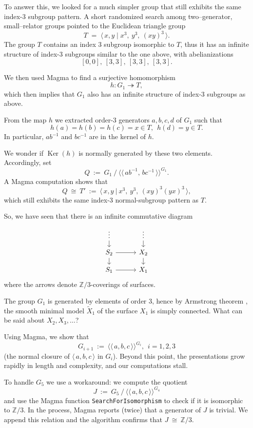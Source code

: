 \documentclass[10pt,a4paper]{article}
\DeclareMathOperator{\Ker}{Ker}
\newcommand{\ZZ}{\mathbb{Z}}
\begin{document}
To answer this, we looked for a much simpler group that still exhibits the
same index-\(3\) subgroup pattern. A short randomized search among
two–generator, small–relator groups pointed to the Euclidean triangle group
\[
T \;=\; \langle\, x,y \mid x^{3},\ y^{3},\ (xy)^{3}\,\rangle .
\]
The group $T$ contains an index $3$ subgroup isomorphic to $T$, thus it
has an infinite structure of index-3 subgroups similar to the one above,
with abelianizations
$$[0,0],\ [3,3],\ [3,3],\ [3,3].$$

We then used Magma to find a surjective homomorphism $$h:G_1\twoheadrightarrow T,$$
which then implies that $G_1$ also has an infinite structure of index-3 subgroups as above.

From the map $h$ we extracted order-3 generators $a,b,c,d$ of $G_1$ such that
$$h(a)=h(b)=h(c)=x \in T,\ \ h(d)=y\in T.$$
In particular, $ab^{-1}$ and $bc^{-1}$ are in the kernel of $h.$

We wonder if $\Ker(h)$ is normally generated by these two elements.
Accordingly, set
$$Q\ :=\ G_1\ \big/\ \big\langle\!\big\langle\, ab^{-1},\,bc^{-1}\,\big\rangle\!\big\rangle^{G_1}.$$
A Magma computation shows that
$$Q\ \cong\ T'\ :=\ \big\langle\, x,y\ \big|\ x^{3},\ y^{3},\ (xy)^{3}(yx)^{3}\,\big\rangle,$$
which still exhibits the same index-3 normal-subgroup pattern as $T$.

So, we have seen that there is an infinite commutative diagram
\[
\begin{tikzcd}[row sep=1.0em, column sep=3em]
\vdots \arrow[r, phantom] \arrow[d] & \vdots \arrow[d] \\
S_{2}  \arrow[r] \arrow[d] & X_{2}  \arrow[d] \\
S_{1}  \arrow[r]            & X_{1}
\end{tikzcd}
\]
where the arrows denote $\ZZ/3$-coverings of surfaces.

The group $G_1$ is generated by elements of order 3,
hence by Armstrong theorem \cite{Armstrong},
the smooth minimal model $\tilde X_1$ of the surface $X_1$ is simply connected.
What can be said about $X_2, X_3,\ldots$?

Using Magma, we show that
$$G_{i+1}\ :=\ \big\langle\!\big\langle\, a,b,c\,\big\rangle\!\big\rangle^{G_i},\ \ i=1,2,3$$
(the normal closure of $\big\langle\, a,b,c\,\big\rangle$ in $G_i$).
Beyond this point, the presentations grow rapidly in length and complexity, and our computations stall.

To handle $G_5$ we use a workaround:
we compute the quotient
$$J\ :=\ G_5\ \big/\ \big\langle\!\big\langle\, a,b,c\,\big\rangle\!\big\rangle^{G_4}$$
and use the Magma function \texttt{SearchForIsomorphism} to check if it is isomorphic to $\ZZ/3.$
In the process, Magma reports (twice) that a generator of $J$ is trivial.
We append this relation and the algorithm confirms that $J\ \cong\ \ZZ/3.$
\end{document}
